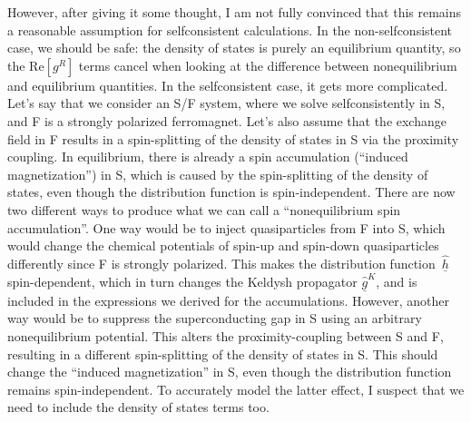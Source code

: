 However, after giving it some thought, I am not fully convinced that this remains a reasonable assumption for selfconsistent calculations.
In the non-selfconsistent case, we should be safe: the density of states is purely an equilibrium quantity, so the $\text{Re}[g^R]$ terms cancel when looking at the difference between nonequilibrium and equilibrium quantities.
In the selfconsistent case, it gets more complicated.
Let's say that we consider an S/F system, where we solve selfconsistently in S, and F is a strongly polarized ferromagnet.
Let's also assume that the exchange field in F results in a spin-splitting of the density of states in S via the proximity coupling.
In equilibrium, there is already a spin accumulation (``induced magnetization'') in S, which is caused by the spin-splitting of the density of states, even though the distribution function is spin-independent.
There are now two different ways to produce what we can call a ``nonequilibrium spin accumulation''.
One way would be to inject quasiparticles from F into S, which would change the chemical potentials of spin-up and spin-down quasiparticles differently since F is strongly polarized.
This makes the distribution function~$\underline{\hat{h}}$ spin-dependent, which in turn changes the Keldysh propagator $\underline{\hat{g}}^K$, and is included in the expressions we derived for the accumulations.
However, another way would be to suppress the superconducting gap in S using an arbitrary nonequilibrium potential.
This alters the proximity-coupling between S and F, resulting in a different spin-splitting of the density of states in S.
This should change the ``induced magnetization'' in S, even though the distribution function remains spin-independent.
To accurately model the latter effect, I suspect that we need to include the density of states terms too.

